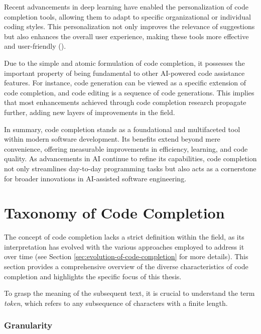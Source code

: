 Recent advancements in deep learning have enabled the personalization of code completion tools, allowing them to adapt to specific organizational or individual coding styles. This personalization not only improves the relevance of suggestions but also enhances the overall user experience, making these tools more effective and user-friendly (\cite{giagnorio2025}).

Due to the simple and atomic formulation of code completion, it possesses the important property of being fundamental to other AI-powered code assistance features. For instance, code generation can be viewed as a specific extension of code completion, and code editing is a sequence of code generations. This implies that most enhancements achieved through code completion research propagate further, adding new layers of improvements in the field.

In summary, code completion stands as a foundational and multifaceted tool within modern software development. Its benefits extend beyond mere convenience, offering measurable improvements in efficiency, learning, and code quality. As advancements in AI continue to refine its capabilities, code completion not only streamlines day-to-day programming tasks but also acts as a cornerstone for broader innovations in AI-assisted software engineering.

\section{Taxonomy of Code Completion}

The concept of code completion lacks a strict definition within the field, as its interpretation has evolved with the various approaches employed to address it over time (see Section \ref{sec:evolution-of-code-completion} for more details). This section provides a comprehensive overview of the diverse characteristics of code completion and highlights the specific focus of this thesis.

To grasp the meaning of the subsequent text, it is crucial to understand the term \textit{token}, which refers to any subsequence of characters with a finite length.  %

\subsubsection*{Granularity}

